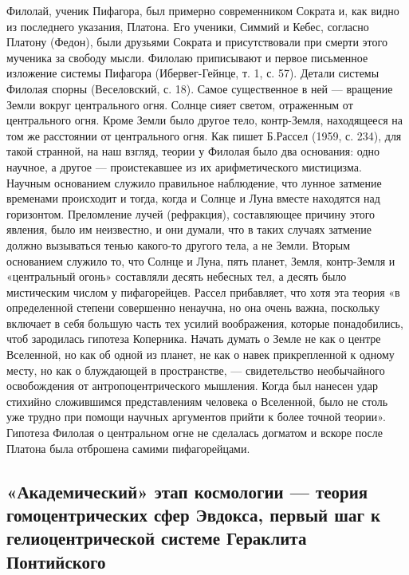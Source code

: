 Филолай, ученик Пифагора, был примерно современником Сократа и, как
видно из последнего указания, Платона. Его ученики, Симмий и Кебес,
согласно Платону (Федон), были друзьями Сократа и присутствовали при
смерти этого мученика за свободу мысли. Филолаю приписывают и первое
письменное изложение системы Пифагора (Ибервег-Гейнце, т. 1, с. 57).
Детали системы Филолая спорны (Веселовский, с. 18). Самое существенное
в ней --- вращение Земли вокруг центрального огня. Солнце сияет
светом, отраженным от центрального огня. Кроме Земли было другое тело,
контр-Земля, находящееся на том же расстоянии от центрального огня.
Как пишет Б.Рассел (1959, с. 234), для такой странной, на наш взгляд,
теории у Филолая было два основания: одно научное, а другое ---
проистекавшее из их арифметического мистицизма. Научным основанием
служило правильное наблюдение, что лунное затмение временами
происходит и тогда, когда и Солнце и Луна вместе находятся над
горизонтом. Преломление лучей (рефракция), составляющее причину этого
явления, было им неизвестно, и они думали, что в таких случаях
затмение должно вызываться тенью какого-то другого тела, а не Земли.
Вторым основанием служило то, что Солнце и Луна, пять планет, Земля,
контр-Земля и «центральный огонь» составляли десять небесных тел, а
десять было мистическим числом у пифагорейцев. Рассел прибавляет, что
хотя эта теория «в определенной степени совершенно ненаучна, но она
очень важна, поскольку включает в себя большую часть тех усилий
воображения, которые понадобились, чтоб зародилась гипотеза Коперника.
Начать думать о Земле не как о центре Вселенной, но как об одной из
планет, не как о навек прикрепленной к одному месту, но как о
блуждающей в пространстве, --- свидетельство необычайного освобождения
от антропоцентрического мышления. Когда был нанесен удар стихийно
сложившимся представлениям человека о Вселенной, было не столь уже
трудно при помощи научных аргументов прийти к более точной теории».
Гипотеза Филолая о центральном огне не сделалась догматом и вскоре
после Платона была отброшена самими пифагорейцами.

\subsection{«Академический» этап космологии --- теория
гомоцентрических сфер Эвдокса, первый шаг к гелиоцентрической системе
Гераклита Понтийского}

